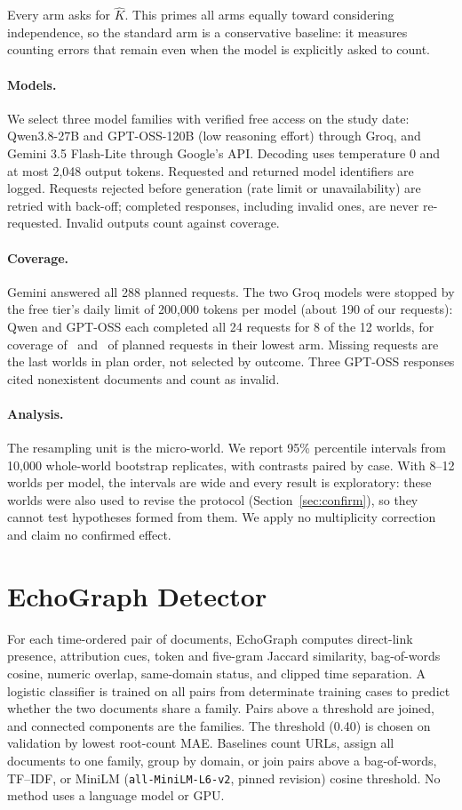 \documentclass[11pt]{article}
\newcommand{\code}[1]{\texttt{#1}}
\begin{document}
Every arm asks for $\widehat K$. This primes all arms equally toward considering independence, so
the standard arm is a conservative baseline: it measures counting errors that remain even when the
model is explicitly asked to count.

\paragraph{Models.}
We select three model families with verified free access on the study date: Qwen3.8-27B and
GPT-OSS-120B (low reasoning effort) through Groq, and Gemini 3.5 Flash-Lite through Google's API.
Decoding uses temperature 0 and at most 2,048 output tokens. Requested and returned model
identifiers are logged. Requests rejected before generation (rate limit or unavailability) are
retried with back-off; completed responses, including invalid ones, are never re-requested.
Invalid outputs count against coverage.

\paragraph{Coverage.}
Gemini answered all 288 planned requests. The two Groq models were stopped by the free tier's
daily limit of 200,000 tokens per model (about 190 of our requests): Qwen and GPT-OSS each completed
all 24 requests for 8 of the 12 worlds, for coverage of \DevQwenCoverage\ and \DevGptossCoverage\
of planned requests in their lowest arm. Missing requests are the last worlds in plan order, not
selected by outcome. Three GPT-OSS responses cited nonexistent documents and count as invalid.

\paragraph{Analysis.}
The resampling unit is the micro-world. We report 95\% percentile intervals from 10,000
whole-world bootstrap replicates, with contrasts paired by case. With 8--12 worlds per model, the
intervals are wide and every result is exploratory: these worlds were also used to revise the
protocol (Section~\ref{sec:confirm}), so they cannot test hypotheses formed from them. We apply no
multiplicity correction and claim no confirmed effect.

\section{EchoGraph Detector}
For each time-ordered pair of documents, EchoGraph computes direct-link presence, attribution cues,
token and five-gram Jaccard similarity, bag-of-words cosine, numeric overlap, same-domain status,
and clipped time separation. A logistic classifier is trained on all pairs from determinate
training cases to predict whether the two documents share a family. Pairs above a threshold are
joined, and connected components are the families. The threshold (0.40) is chosen on validation by
lowest root-count MAE. Baselines count URLs, assign all documents to one family, group by domain,
or join pairs above a bag-of-words, TF--IDF, or MiniLM (\code{all-MiniLM-L6-v2}, pinned revision)
cosine threshold. No method uses a language model or GPU.
\end{document}

